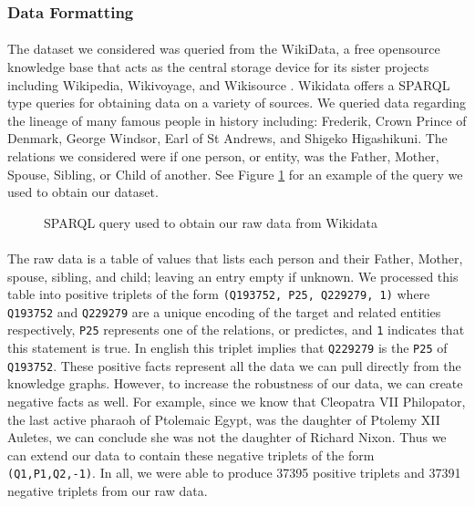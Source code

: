 \documentclass[11.5pt]{article}
\newcounter{Figure}
\begin{document}
\subsubsection{Data Formatting}


\paragraph{} The dataset we considered was queried from the WikiData, a free opensource knowledge base that acts as the central storage device for its sister projects including Wikipedia, Wikivoyage, and Wikisource \cite{Wikidata}. Wikidata offers a SPARQL type queries for obtaining data on a variety of sources. We queried data regarding the lineage of many famous people in history including: Frederik, Crown Prince of Denmark, George Windsor, Earl of St Andrews, and Shigeko Higashikuni. The relations we considered were if one person, or entity, was the Father, Mother, Spouse, Sibling, or Child of another. See Figure \ref{query} for an example of the query we used to obtain our dataset. 


\begin{figure}[h!]
 
 \caption{\small SPARQL query used to obtain our raw data from Wikidata}
 \label{query}
\end{figure}


\paragraph{} The raw data is a table of values that lists each person and their Father, Mother, spouse, sibling, and child; leaving an entry empty if unknown. We processed this table into positive triplets of the form \texttt{(Q193752, P25, Q229279, 1)} where \texttt{Q193752} and \texttt{Q229279} are a unique encoding of the target and related entities respectively, \texttt{P25} represents one of the relations, or predictes, and \texttt{1} indicates that this statement is true. In english this triplet implies that \texttt{Q229279} is the \texttt{P25} of \texttt{Q193752}. These positive facts represent all the data we can pull directly from the knowledge graphs. However, to increase the robustness of our data, we can create negative facts as well. For example, since we know that Cleopatra VII Philopator, the last active pharaoh of Ptolemaic Egypt, was the daughter of Ptolemy XII Auletes, we can conclude she was not the daughter of Richard Nixon. Thus we can extend our data to contain these negative triplets of the form \texttt{(Q1,P1,Q2,-1)}. In all, we were able to produce 37395 positive triplets and 37391 negative triplets from our raw data. 
\end{document}
